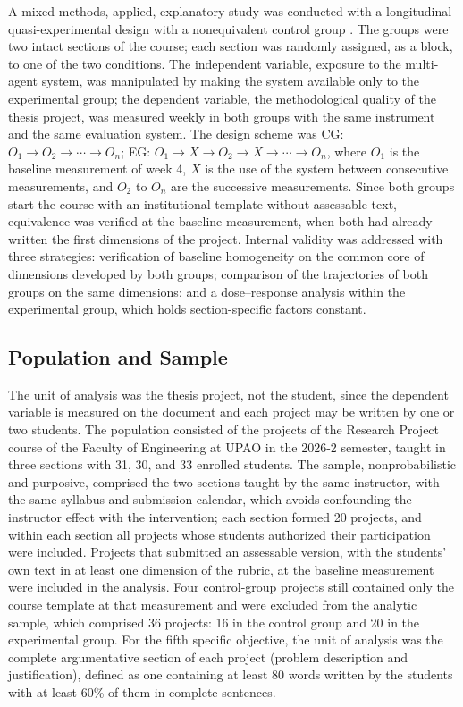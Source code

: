 \documentclass[journal]{IEEEtran}
\begin{document}
A mixed-methods, applied, explanatory study was conducted with a longitudinal quasi-experimental design with a nonequivalent control group \cite{hernandez2018}. The groups were two intact sections of the course; each section was randomly assigned, as a block, to one of the two conditions. The independent variable, exposure to the multi-agent system, was manipulated by making the system available only to the experimental group; the dependent variable, the methodological quality of the thesis project, was measured weekly in both groups with the same instrument and the same evaluation system. The design scheme was CG: $O_1 \rightarrow O_2 \rightarrow \cdots \rightarrow O_n$; EG: $O_1 \rightarrow X \rightarrow O_2 \rightarrow X \rightarrow \cdots \rightarrow O_n$, where $O_1$ is the baseline measurement of week 4, $X$ is the use of the system between consecutive measurements, and $O_2$ to $O_n$ are the successive measurements. Since both groups start the course with an institutional template without assessable text, equivalence was verified at the baseline measurement, when both had already written the first dimensions of the project. Internal validity was addressed with three strategies: verification of baseline homogeneity on the common core of dimensions developed by both groups; comparison of the trajectories of both groups on the same dimensions; and a dose--response analysis within the experimental group, which holds section-specific factors constant.

\subsection{Population and Sample}

The unit of analysis was the thesis project, not the student, since the dependent variable is measured on the document and each project may be written by one or two students. The population consisted of the projects of the Research Project course of the Faculty of Engineering at UPAO in the 2026-2 semester, taught in three sections with 31, 30, and 33 enrolled students. The sample, nonprobabilistic and purposive, comprised the two sections taught by the same instructor, with the same syllabus and submission calendar, which avoids confounding the instructor effect with the intervention; each section formed 20 projects, and within each section all projects whose students authorized their participation were included. Projects that submitted an assessable version, with the students' own text in at least one dimension of the rubric, at the baseline measurement were included in the analysis. Four control-group projects still contained only the course template at that measurement and were excluded from the analytic sample, which comprised 36 projects: 16 in the control group and 20 in the experimental group. For the fifth specific objective, the unit of analysis was the complete argumentative section of each project (problem description and justification), defined as one containing at least 80 words written by the students with at least 60\% of them in complete sentences.
\end{document}
